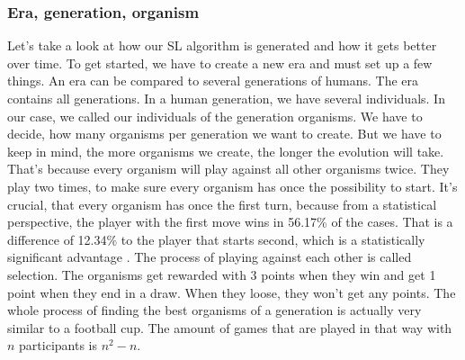 \subsubsection{Era, generation, organism}
Let's take a look at how our \ac{SL} algorithm is generated and how it gets better over time.
To get started, we have to create a new \ac{era} and must set up a few things. An era can be compared to several \acp{generation} of humans. 
The era contains all generations. In a human generation, we have several individuals. In our case, we called our individuals of the generation \acp{organism}. We have to decide, how many organisms per generation we want to create. But we have to keep in mind, the more organisms we create, the longer the evolution will take. That's because every organism will play against all other organisms twice. They play two times, to make sure every organism has once the possibility to start. It's crucial, that every organism has once the first turn, because from a statistical perspective, the player with the first move wins in 56.17\% of the cases. That is a difference of 12.34\% to the player that starts second, which is a statistically significant advantage \cite[p.~5]{web:tsurel2013}.
The process of playing against each other is called selection. The organisms get rewarded with 3 points when they win and get 1 point when they end in a draw. When they loose, they won't get any points. The whole process of finding the best organisms of a generation is actually very similar to a football cup.
The amount of games that are played in that way with $n$ participants is $n^2-n$.\\

